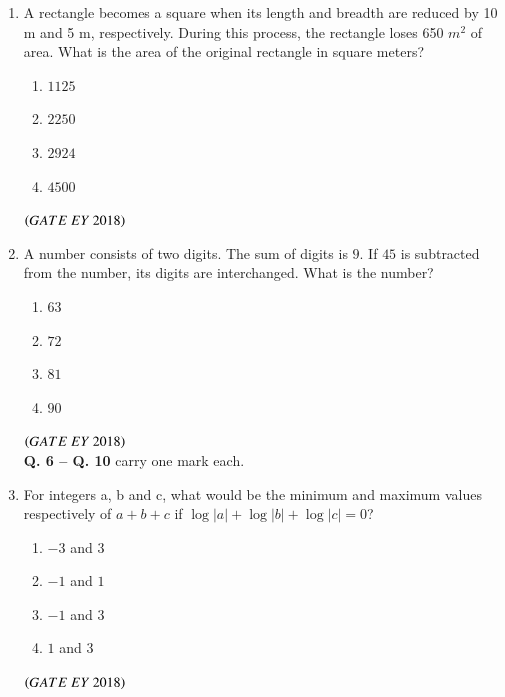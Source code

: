 \documentclass[journal]{IEEEtran}
\numberwithin{equation}{enumi}
\numberwithin{figure}{enumi}
\begin{document}
\begin{enumerate}
\begin{multicols}{4}
\begin{enumerate}
    \item $7$
    \item $100$
    \item $700$
\end{enumerate}
\end{multicols}
\hfill{$\brak{ GATE\ EY\ 2018}$}
\bigskip
\item A rectangle becomes a square when its length and breadth are reduced by 10 m and 5 m, respectively. During this process, the rectangle loses 650 $m^2$ of area. What is the area of the original rectangle in square meters?
\begin{multicols}{4}
\begin{enumerate}
    \item $1125$
    \item $2250$
    \item $2924$
    \item $4500$
\end{enumerate}
\end{multicols}
\hfill{$\brak{ GATE\ EY\ 2018}$}
\bigskip
\item A number consists of two digits. The sum of digits is $9$. If $45$ is subtracted from the number, its digits are interchanged. What is the number?
\begin{multicols}{4}
\begin{enumerate}
    \item $63$
    \item $72$
    \item $81$
    \item $90$
\end{enumerate}
\end{multicols}
\hfill{$\brak{ GATE\ EY\ 2018}$}
\bigskip
\\
\noindent \textbf{Q. 6 -- Q. \textbf{10}} carry one mark each.
\\
\item For integers a, b and c, what would be the minimum and maximum values respectively of $a+b+c$ if $\log|a|+\log|b|+\log|c|=0$?
\begin{multicols}{4}
\begin{enumerate}
    \item $-3$ and $3$
    \item $-1$ and $1$
    \item $-1$ and $3$
    \item $1$ and $3$
\end{enumerate}
\end{multicols}
\hfill{$\brak{ GATE\ EY\ 2018}$}

\end{enumerate}
\end{document}
